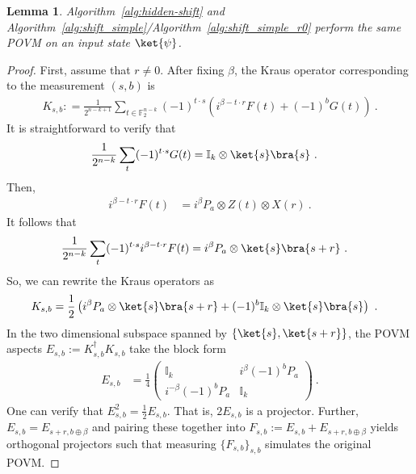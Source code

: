 \documentclass[11pt]{article}
\newtheorem{lemma}[theorem]{Lemma}
\newcommand{\id}{\ensuremath{\mathbb{I}}}
\newcommand{\F}{\mathbb{F}}
\begin{document}
\begin{lemma}
    Algorithm~\ref{alg:hidden-shift} and Algorithm~\ref{alg:shift_simple}/Algorithm~\ref{alg:shift_simple_r0} perform the same POVM on an input state $\ket{\psi}$.
\end{lemma}
\begin{proof}
    First, assume that $r \neq 0$. After fixing $\beta$, the Kraus operator corresponding to the measurement $(s,b)$ is
    \begin{align}
        K_{s,b}: = \frac{1}{2^{n-k+1}}\sum_{t\in\F_2^{n-k}} (-1)^{t\cdot s} \left( i^{\beta - t\cdot r}F(t) + (-1)^b G(t) \right)\ .
    \end{align}
    It is straightforward to verify that
    \begin{align}
        \frac{1}{2^{n-k}} \sum_t (-1)^{t\cdot s} G(t) & = \id_k \otimes \ket{s}\bra{s}\ .
    \end{align}
    Then,
    \begin{align}
        i^{\beta - t\cdot r}F(t) & = i^\beta P_a \otimes Z(t)\otimes X(r)\ .
    \end{align}
    It follows that
    \begin{align}
        \frac{1}{2^{n-k}} \sum_t (-1)^{t\cdot s} i^{\beta - t\cdot r} F(t) & = i^\beta P_a \otimes \ket{s}\bra{s+r}\ .
    \end{align}
    So, we can rewrite the Kraus operators as
    \begin{align}
        K_{s,b} & = \frac{1}{2}\left( i^\beta P_a\otimes \ket{s}\bra{s+r} + (-1)^b \id_k \otimes \ket{s}\bra{s} \right)\ .
    \end{align}
    In the two dimensional subspace spanned by $\{\ket{s},\ket{s+r}\}$, the POVM aspects $E_{s,b} := K_{s,b}^\dagger K_{s,b}$ take the block form
    \begin{align}
        E_{s,b} & = \frac{1}{4}\begin{pmatrix}
          \id_k & i^\beta (-1)^b P_a\\
          i^{-\beta} (-1)^b P_a & \id_k
        \end{pmatrix}\ .
    \end{align}
    One can verify that $E_{s,b}^2 = \frac{1}{2}E_{s,b}$. That is, $2E_{s,b}$ is a projector. Further, $E_{s,b}=E_{s+r,b\oplus \beta}$ and pairing these together into $F_{s,b} := E_{s,b}+E_{s+r,b\oplus\beta}$ yields orthogonal projectors such that measuring $\{F_{s,b}\}_{s,b}$ simulates the original POVM.


\end{proof}
\end{document}
